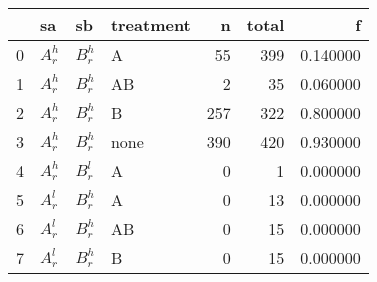 \begin{tabular}{llllrrr}
\toprule
 & sa & sb & treatment & n & total & f \\
\midrule
0 & $A^h_r$ & $B^h_r$ & A & 55 & 399 & 0.140000 \\
1 & $A^h_r$ & $B^h_r$ & AB & 2 & 35 & 0.060000 \\
2 & $A^h_r$ & $B^h_r$ & B & 257 & 322 & 0.800000 \\
3 & $A^h_r$ & $B^h_r$ & none & 390 & 420 & 0.930000 \\
4 & $A^h_r$ & $B^l_r$ & A & 0 & 1 & 0.000000 \\
5 & $A^l_r$ & $B^h_r$ & A & 0 & 13 & 0.000000 \\
6 & $A^l_r$ & $B^h_r$ & AB & 0 & 15 & 0.000000 \\
7 & $A^l_r$ & $B^h_r$ & B & 0 & 15 & 0.000000 \\
\bottomrule
\end{tabular}
